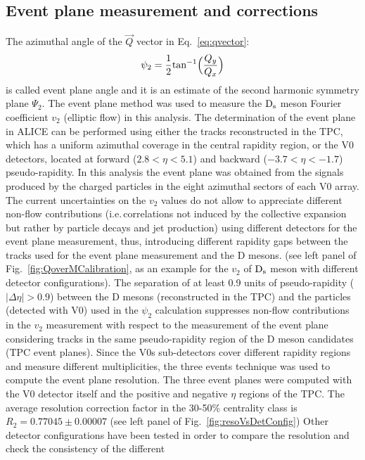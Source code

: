 \subsection{Event plane measurement and corrections}
The azimuthal angle of the $\vec{Q}$ vector in Eq.~\ref{eq:qvector}:
\begin{equation}
\label{eq:psi2}
\psi_2= \frac{1}{2} {\rm tan}^{-1} \Big (\frac{Q_y}{Q_x} \Big )
\end{equation}
is called event plane angle and it is an estimate of the second harmonic symmetry plane $\Psi_2$.
The event plane method was used to measure the ${\rm D_s}$ meson 
Fourier coefficient $v_2$ (elliptic flow) in this analysis.
The determination of the event plane in ALICE can be performed using
either the tracks reconstructed in the TPC, which has a uniform
azimuthal coverage in the central rapidity region, or the V0
detectors, located at forward ($2.8<\eta<5.1$) and backward
($-3.7<\eta<-1.7$) pseudo-rapidity.
In this analysis the event plane was obtained from the 
signals produced by the charged particles in the eight 
azimuthal sectors of each V0 array. 
The current uncertainties on the $v_2$ values do not allow to
appreciate different non-flow contributions (i.e.\,correlations not 
induced by the collective expansion but rather by particle decays and 
jet production) using different detectors
for the event plane measurement, thus, introducing different
rapidity gaps between the tracks used for the event plane measurement
and the D mesons. (see left panel of Fig.~\ref{fig:QoverMCalibration},
as an example for the $v_2$ of ${\rm D_s}$ meson with different detector configurations).
The separation of at least 0.9 units of pseudo-rapidity 
($|\Delta\eta|>0.9$) between the D mesons (reconstructed in the TPC)
and the particles (detected with V0) used in the $\psi_2$ calculation
suppresses non-flow contributions in the $v_2$ measurement with respect
to the measurement of the event plane considering tracks in the same
pseudo-rapidity region of the D meson candidates (TPC event planes).
Since the V0s sub-detectors cover different rapidity 
regions and measure different multiplicities, the
three events technique was used to compute the event plane resolution.
The three event planes were computed with the V0 detector itself and the 
positive and negative $\eta$ regions of the TPC.
The average resolution correction factor in the 30-50\% centrality class is
$R_2 = 0.77045 \pm 0.00007$ (see left panel 
of Fig.~\ref{fig:resoVsDetConfig}) 
Other detector 
configurations have been tested in order to compare 
the resolution and check the consistency of the different 
